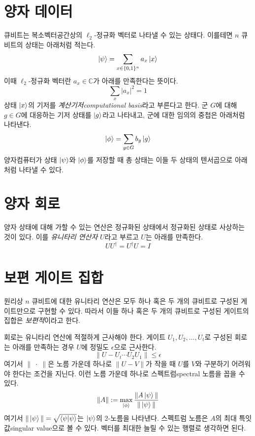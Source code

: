 \documentclass[a4paper,chapter,atbegshi]{oblivoir}
\begin{document}
\section{양자 데이터}
큐비트는 복소벡터공간상의 $\ell_2$-정규화 벡터로 나타낼 수 있는 상태다. 이를테면
$n$ 큐비트의 상태는 아래처럼 적는다.
\[
  \ket{\psi} = \sum_{x\in\{0,1\}^n}a_x\ket{x}
\]
이때 $\ell_2$-정규화 벡터란 $a_x\in\mathbb{C}$가 아래를 만족한다는 뜻이다.
\[
  \sum_x|a_x|^2=1
\]
상태 $\ket{x}$의 기저를 \emph{계산기저\footnotesize{computational basis}}라고
부른다고 한다.
군 $G$에 대해 $g\in G$에 대응하는 기저 상태를 $\ket{g}$라고 나타내고, 군에 대한
임의의 중첩은 아래처럼 나타낸다.
\[
  \ket{\phi}=\sum_{g\in G}b_g\ket{g}
\]
양자컴퓨터가 상태 $\ket{\psi}$와 $\ket{\phi}$를 저장할 때 총 상태는 이들 두
상태의 텐서곱으로 아래처럼 나타낼 수 있다.
\section{양자 회로}
양자 상태에 대해 가할 수 있는 연산은 정규화된 상태에서 정규화된 상태로 사상하는
것이 있다. 이를 \emph{유니타리 연산자} $U$라고 부르고 $U$는 아래를 만족한다.
\[
  UU^{\dagger}=U^{\dagger}U=I
\]
\section{보편 게이트 집합}
원리상 $n$ 큐비트에 대한 유니타리 연산은 모두 하나 혹은 두 개의 큐비트로 구성된
게이트만으로 구현할 수 있다. 따라서 이들 하나 혹은 두 개의 큐비트로 구성된
게이트의 집합은 \emph{보편적}이라고 한다. 

회로는 유니타리 연산에 적절하게 근사해야 한다. 게이트 $U_1,U_2,\ldots,U_t$로
구성된 회로는 아래를 만족하는 경우 $U$에 정밀도 $\epsilon$으로 근사한다.
\[
  \|U-U_t\cdots U_2U_1\|\leq\epsilon
\]
여기서 $\|\;\cdot\;\|$은 노름 가운데 하나로 $\|U-V\|$가 작을 때 $U$를 $V$와
구분하기 어려워야 한다는 조건을 지닌다. 이런 노름 가운데 하나로 
스펙트럼{\footnotesize spectral} 노름을 꼽을 수 있다.
\[
  \|A\|:=\max_{\ket{\phi}}\frac{\|A\ket{\psi}\|}{\|\ket{\psi}\|}
\]
여기서 $\|\ket{\psi}\|=\sqrt{\braket{\psi|\psi}}$는 $\ket{\psi}$의 2-노름을
나타낸다. 스펙트럼 노름은 $A$의 최대 특잇값{\footnotesize singular value}으로
볼 수 있다. 벡터를 최대한 늘릴 수 있는 행렬로 생각하면 된다.


\end{document}
